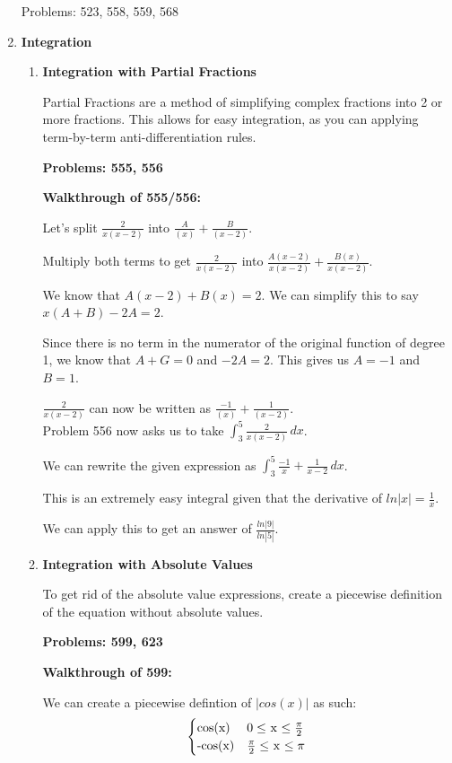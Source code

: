 \documentclass[11pt,twoside]{article}
\begin{document}
\begin{enumerate}
Problems: 523, 558, 559, 568
  
\item \textbf{Integration}

\begin{enumerate}
    \item \textbf{Integration with Partial Fractions}
    
    Partial Fractions are a method of simplifying complex fractions into 2 or more fractions. This allows for easy integration, as you can applying term-by-term anti-differentiation rules.
    
    \textbf{Problems: 555, 556}
    
    \textbf{Walkthrough of 555/556:}
    
    Let's split $\frac{2}{x(x-2)}$ into $\frac{A}{(x)} + \frac{B}{(x-2)}$.
    
    Multiply both terms to get $\frac{2}{x(x-2)}$ into $\frac{A(x-2)}{x(x-2)} + \frac{B(x)}{x(x-2)}$.
    
    We know that $A(x-2) + B(x) = 2$. We can simplify this to say $x(A + B) - 2A = 2$. 
    
    Since there is no term in the numerator of the original function of degree 1, we know that $A + G = 0$ and $-2A = 2$. This gives us $A = -1$ and $B = 1$.
    
    $\frac{2}{x(x-2)}$ can now be written as $\frac{-1}{(x)} + \frac{1}{(x-2)}$. \\
    
    Problem 556 now asks us to take $\int_{3}^{5} \frac{2}{x(x-2)} \,dx$.
    
    We can rewrite the given expression as $\int_{3}^{5} \frac{-1}{x} + \frac{1}{x-2}\,dx$.
    
    This is an extremely easy integral given that the derivative of $ln|x| = \frac{1}{x}$. 
    
    We can apply this to get an answer of $\frac{ln|9|}{ln|5|}$.
    
    \item \textbf{Integration with Absolute Values}
    
    To get rid of the absolute value expressions, create a piecewise definition of the equation without absolute values. 
    
    \textbf{Problems: 599, 623}
    
    \textbf{Walkthrough of 599:}
    
    We can create a piecewise defintion of $|cos(x)|$ as such:
    \[ \begin{cases} 
    $cos(x)$ &  0 \leq $ x $ \leq \frac{\pi}{2} \\
    $-cos(x)$ &  \frac{\pi}{2} \leq $ x $ \leq \pi 
    \end{cases}
    \]
    

\end{enumerate}
\end{enumerate}
\end{document}
